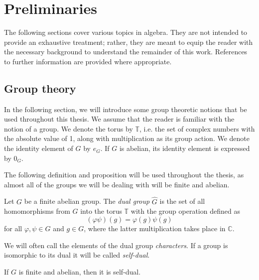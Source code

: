 \chapter{Preliminaries}

The following sections cover various topics in algebra. They are not
intended to provide an exhaustive treatment; rather, they are meant
to equip the reader with the necessary background to understand the
remainder of this work. References to further information are
provided where appropriate.

\section{Group theory}
\label{sec:group-theory}

In the following section, we will introduce some group theoretic notions that
be used throughout this thesis. We assume that the reader is familiar with
the notion of a group. We denote the torus by \( \mathbb{T} \), i.e. the
set of complex numbers with the absolute value of 1, along with multiplication
as its group action. We denote the identity
element of \( G \) by \( e_{G} \). If \( G \) is abelian, its
identity element is expressed by \( 0_{G} \).

The following definition and proposition will be used throughout the
thesis, as almost all of the groups we will be dealing with
will be finite and abelian.

\begin{definition}
    \label{def:dual-group}
    Let \( G \) be a finite abelian group. The \emph{dual group} \(
    \widehat{G} \) is the set of all homomorphisms from \( G \) into
    the torus \(
    \mathbb{T} \) with the group operation defined as
    \[
        \left( \varphi \psi \right)(g) = \varphi(g) \psi(g)
    \]
    for all \( \varphi, \psi \in \widehat{G} \) and \( g \in G\),
    where the latter
    multiplication takes place in \( \mathbb{C} \).
\end{definition}

\begin{remark}
    \label{rem:characters-self-dual}
    We will often call the elements of the dual group
    \emph{characters}. If a group is isomorphic to its dual it will
    be called \emph{self-dual}.
\end{remark}

\begin{proposition}
    \label{prop:finite-abelian-self-dual}
    If \( G \) is finite and abelian, then it is self-dual.
\end{proposition}


